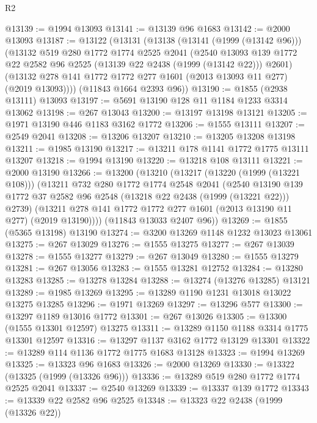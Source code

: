 \begin{lexlean}{R2}
\begin{coremodule}
@13139 := @1994 @13093
@13141 := @13139 @96 @1683
@13142 := @2000 @13093
@13187 := @13122
    (@13131
      (@13138
        (@13141 (@1999 (@13142 @96)))
        (@13132
          @519
          @280
          @1772
          @1774
          @2525
          @2041
          (@2540
            @13093
            @139
            @1772
            @22
            @2582
            @96
            @2525
            (@13139 @22 @2438 (@1999 (@13142 @22)))
            @2601)
          (@13132 @278 @141 @1772 @1772 @277 @1601 (@2013 @13093 @11 @277) (@2019 @13093))))
      (@11843 @1664 @2393 @96))
@13190 := @1855 (@2938 @13111) @13093
@13197 := @5691 @13190 @128 @11 @1184 @1233 @3314 @13062
@13198 := @267 @13043
@13200 := @13197 @13198 @13121
@13205 := @1971 @13190 @446 @1183 @3162 @1772
@13206 := @1555 @13111
@13207 := @2549 @2041
@13208 := @13206 @13207
@13210 := @13205 @13208 @13198
@13211 := @1985 @13190
@13217 := @13211 @178 @1141 @1772 @1775 @13111 @13207
@13218 := @1994 @13190
@13220 := @13218 @108 @13111
@13221 := @2000 @13190
@13266 := @13200
    (@13210
      (@13217
        (@13220 (@1999 (@13221 @108)))
        (@13211
          @732
          @280
          @1772
          @1774
          @2548
          @2041
          (@2540
            @13190
            @139
            @1772
            @37
            @2582
            @96
            @2548
            (@13218 @22 @2438 (@1999 (@13221 @22)))
            @2739)
          (@13211 @278 @141 @1772 @1772 @277 @1601 (@2013 @13190 @11 @277) (@2019 @13190))))
      (@11843 @13033 @2407 @96))
@13269 := @1855 (@5365 @13198) @13190
@13274 := @3200 @13269 @1148 @1232 @13023 @13061
@13275 := @267 @13029
@13276 := @1555 @13275
@13277 := @267 @13039
@13278 := @1555 @13277
@13279 := @267 @13049
@13280 := @1555 @13279
@13281 := @267 @13056
@13283 := @1555 @13281 @12752
@13284 := @13280 @13283
@13285 := @13278 @13284
@13288 := @13274 (@13276 @13285) @13121
@13289 := @1985 @13269
@13295 := @13289 @1190 @1231 @13018 @13022 @13275 @13285
@13296 := @1971 @13269
@13297 := @13296 @577
@13300 := @13297 @1189 @13016 @1772
@13301 := @267 @13026
@13305 := @13300 (@1555 @13301 @12597) @13275
@13311 := @13289 @1150 @1188 @3314 @1775 @13301 @12597
@13316 := @13297 @1137 @3162 @1772 @13129 @13301
@13322 := @13289 @114 @1136 @1772 @1775 @1683 @13128
@13323 := @1994 @13269
@13325 := @13323 @96 @1683
@13326 := @2000 @13269
@13330 := @13322 (@13325 (@1999 (@13326 @96)))
@13336 := @13289 @519 @280 @1772 @1774 @2525 @2041
@13337 := @2540 @13269
@13339 := @13337 @139 @1772
@13343 := @13339 @22 @2582 @96 @2525
@13348 := @13323 @22 @2438 (@1999 (@13326 @22))

\end{coremodule}
\end{lexlean}
